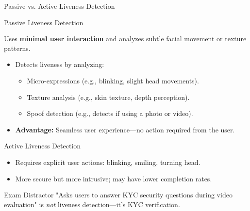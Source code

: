 \documentclass{beamer}
\begin{document}
	\begin{frame}{Passive vs. Active Liveness Detection}
		\begin{block}{Passive Liveness Detection}
			\begin{center}
				Uses \textbf{minimal user interaction} and analyzes subtle facial movement or texture patterns.
			\end{center}
			\begin{itemize}
				\item Detects liveness by analyzing:
				\begin{itemize}
					\item Micro-expressions (e.g., blinking, slight head movements).
					\item Texture analysis (e.g., skin texture, depth perception).
					\item Spoof detection (e.g., detects if using a photo or video).
				\end{itemize}
				\item \textbf{Advantage:} Seamless user experience—no action required from the user.
			\end{itemize}
		\end{block}
		\begin{block}{Active Liveness Detection}
			\begin{itemize}
				\item Requires explicit user actions: blinking, smiling, turning head.
				\item More secure but more intrusive; may have lower completion rates.
			\end{itemize}
		\end{block}
		\begin{alertblock}{Exam Distractor}
			"Asks users to answer KYC security questions during video evaluation" is \textit{not} liveness detection—it's KYC verification.
		\end{alertblock}
	\end{frame}
	
\end{document}
